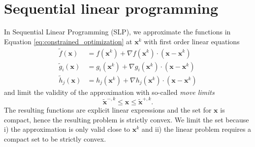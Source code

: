 \section{Sequential linear programming}
In Sequential Linear Programming (SLP), we approximate the functions in Equation \eqref{eq:constrained_optimization} at $\mathbf{x}^k$ with first order linear equations  
\begin{align}
    \tilde{f}(\mathbf{x}) &= f(\mathbf{x}^k) + \nabla f(\mathbf{x}^k) \cdot \left(\mathbf{x} - \mathbf{x}^k \right) \\
    \tilde{g}_i(\mathbf{x}) &= g_i(\mathbf{x}^k) + \nabla g_i(\mathbf{x}^k) \cdot \left(\mathbf{x} - \mathbf{x}^k \right) \\
    \tilde{h}_j(\mathbf{x}) &= h_j(\mathbf{x}^k) + \nabla h_j(\mathbf{x}^k) \cdot \left(\mathbf{x} - \mathbf{x}^k \right)
\end{align}
and limit the validity of the approximation with so-called \emph{move limits} 
\begin{equation}
    \tilde{\mathbf{x}}^{-,k} \le \mathbf{x} \le \tilde{\mathbf{x}}^{+,k}.
\end{equation}
The resulting functions are explicit linear expressions and the set for $\mathbf{x}$ is compact, hence the resulting problem is strictly convex. We limit the set because i) the approximation is only valid close to $\mathbf{x}^k$ and ii) the linear problem requires a compact set to be strictly convex. 

